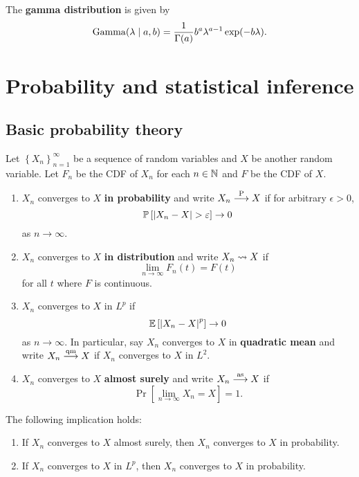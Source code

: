 \documentclass[a4paper]{article}
\begin{document}
\begin{defi}
The \textbf{gamma distribution} is given by 
\[
\operatorname{Gamma}(\lambda \mid a, b) = 
\frac{1}{\Gamma(a)} b^a \lambda^{a - 1} \exp (-b \lambda).
\]  
\end{defi}

\section{Probability and statistical inference}

\subsection{Basic probability theory}
\begin{defi}
Let $\left\{ X_n \right\}_{n=1}^\infty$ be a sequence of random
variables and $X$ be another random variable. Let
$F_n$ be the CDF of $X_n$ for each $n \in \mathbb{N}$ and $F$
be the CDF of $X$.
\begin{enumerate}
  \item $X_n$ converges to $X$ \textbf{in probability}
  and write $X_n \overset{\mathrm{P}}{\longrightarrow} X$ if for arbitrary
  $\epsilon > 0$,
  \[
  \mathbb{P} \left[ \left\lvert X_n - X\right\rvert > \varepsilon \right] \to 0
  \]
  as $n \to \infty$.

  \item $X_n$ converges to $X$ \textbf{in distribution} and
  write $X_n \rightsquigarrow X$ if
  \[
  \lim_{n \to \infty} F_n(t) = F(t)
  \]
  for all $t$ where $F$ is continuous.

  \item $X_n$ converges to $X$ in $L^p$ if
  \[
  \mathbb{E} \left[ \left\lvert X_n - X\right\rvert^p \right] \to 0
  \]
  as $n \to \infty$. In particular, say $X_n$ converges to
  $X$ in \textbf{quadratic mean} and write $X_n \overset{\mathrm{qm}}{\longrightarrow} X$
  if $X_n$ converges to $X$ in $L^2$.

  \item $X_n$ converges to $X$ \textbf{almost surely}
  and write $X_n \overset{\mathrm{as}}{\longrightarrow} X$ if
  \[
  \Pr \left[ \lim_{n \to \infty} X_n =  X \right] = 1.
  \]
\end{enumerate}
\end{defi}

\begin{thm}
The following implication holds:
\begin{enumerate}
  \item If $X_n$ converges to $X$ almost surely,
  then $X_n$ converges to $X$ in probability.

  \item If $X_n$ converges to $X$ in $L^p$, then
  $X_n$ converges to $X$ in probability.
\end{enumerate}
\end{thm}
\end{document}
